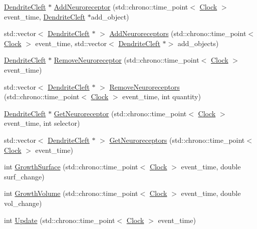 \begin{DoxyCompactItemize}
\item 
\mbox{\hyperlink{class_dendrite_cleft}{Dendrite\+Cleft}} $\ast$ \mbox{\hyperlink{class_dendrite_cleft_a65901c5659ca5eac161a26f15e0f437b}{Add\+Neuroreceptor}} (std\+::chrono\+::time\+\_\+point$<$ \mbox{\hyperlink{universe_8h_a0ef8d951d1ca5ab3cfaf7ab4c7a6fd80}{Clock}} $>$ event\+\_\+time, \mbox{\hyperlink{class_dendrite_cleft}{Dendrite\+Cleft}} $\ast$add\+\_\+object)
\item 
std\+::vector$<$ \mbox{\hyperlink{class_dendrite_cleft}{Dendrite\+Cleft}} $\ast$ $>$ \mbox{\hyperlink{class_dendrite_cleft_a6d29f577ff12366f8f51804b13468395}{Add\+Neuroreceptors}} (std\+::chrono\+::time\+\_\+point$<$ \mbox{\hyperlink{universe_8h_a0ef8d951d1ca5ab3cfaf7ab4c7a6fd80}{Clock}} $>$ event\+\_\+time, std\+::vector$<$ \mbox{\hyperlink{class_dendrite_cleft}{Dendrite\+Cleft}} $\ast$$>$ add\+\_\+objects)
\item 
\mbox{\hyperlink{class_dendrite_cleft}{Dendrite\+Cleft}} $\ast$ \mbox{\hyperlink{class_dendrite_cleft_afaf06d4516355dfe2e0e4c33a00f0f1d}{Remove\+Neuroreceptor}} (std\+::chrono\+::time\+\_\+point$<$ \mbox{\hyperlink{universe_8h_a0ef8d951d1ca5ab3cfaf7ab4c7a6fd80}{Clock}} $>$ event\+\_\+time)
\item 
std\+::vector$<$ \mbox{\hyperlink{class_dendrite_cleft}{Dendrite\+Cleft}} $\ast$ $>$ \mbox{\hyperlink{class_dendrite_cleft_ac29b12d4abcc47fa298ab9e95f578f0e}{Remove\+Neuroreceptors}} (std\+::chrono\+::time\+\_\+point$<$ \mbox{\hyperlink{universe_8h_a0ef8d951d1ca5ab3cfaf7ab4c7a6fd80}{Clock}} $>$ event\+\_\+time, int quantity)
\item 
\mbox{\hyperlink{class_dendrite_cleft}{Dendrite\+Cleft}} $\ast$ \mbox{\hyperlink{class_dendrite_cleft_a5eb3a8f143f63b852b8f5e245d385519}{Get\+Neuroreceptor}} (std\+::chrono\+::time\+\_\+point$<$ \mbox{\hyperlink{universe_8h_a0ef8d951d1ca5ab3cfaf7ab4c7a6fd80}{Clock}} $>$ event\+\_\+time, int selector)
\item 
std\+::vector$<$ \mbox{\hyperlink{class_dendrite_cleft}{Dendrite\+Cleft}} $\ast$ $>$ \mbox{\hyperlink{class_dendrite_cleft_a4a14361574777fb1d66fd4ed2d4f2492}{Get\+Neuroreceptors}} (std\+::chrono\+::time\+\_\+point$<$ \mbox{\hyperlink{universe_8h_a0ef8d951d1ca5ab3cfaf7ab4c7a6fd80}{Clock}} $>$ event\+\_\+time)
\item 
int \mbox{\hyperlink{class_dendrite_cleft_af4715ffbf1bf437523d07e37b7abc3e0}{Growth\+Surface}} (std\+::chrono\+::time\+\_\+point$<$ \mbox{\hyperlink{universe_8h_a0ef8d951d1ca5ab3cfaf7ab4c7a6fd80}{Clock}} $>$ event\+\_\+time, double surf\+\_\+change)
\item 
int \mbox{\hyperlink{class_dendrite_cleft_a0cb2fc6ad72bba55b5f65130006d4b12}{Growth\+Volume}} (std\+::chrono\+::time\+\_\+point$<$ \mbox{\hyperlink{universe_8h_a0ef8d951d1ca5ab3cfaf7ab4c7a6fd80}{Clock}} $>$ event\+\_\+time, double vol\+\_\+change)
\item 
int \mbox{\hyperlink{class_dendrite_cleft_a3a75af4d6fd97c9635134509f170a04e}{Update}} (std\+::chrono\+::time\+\_\+point$<$ \mbox{\hyperlink{universe_8h_a0ef8d951d1ca5ab3cfaf7ab4c7a6fd80}{Clock}} $>$ event\+\_\+time)
\end{DoxyCompactItemize}
